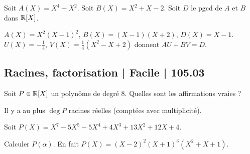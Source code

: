 \begin{question}

Soit $A(X) = X^4-X^2$. Soit $B(X) = X^2+X-2$.
Soit $D$ le pgcd de $A$ et $B$ dans $\mathbb{R}[X]$.
\begin{answers}



\end{answers}
\begin{explanations}
$A(X)=X^2(X-1)^2$, $B(X)=(X-1)(X+2)$, $D(X)=X-1$. $U(X)= -\frac14$, $V(X)=\frac14(X^2-X+2)$ donnent $AU+BV=D$.
\end{explanations}
\end{question}

\subsection{Racines, factorisation | Facile | 105.03}


\begin{question}

Soit $P \in \mathbb{R}[X]$ un polynôme de degré $8$.
Quelles sont les affirmations vraies ?
\begin{answers}



    
\end{answers}
\begin{explanations}
Il y a au plus $\deg P$ racines réelles (comptées avec multiplicité).
\end{explanations}
\end{question}


\begin{question}

Soit $P(X) = X^7 - 5 X^5 - 5 X^4 + 4 X^3 + 13 X^2 + 12 X + 4$.
\begin{answers}


    
    
\end{answers}
\begin{explanations}
Calculer $P(\alpha)$. En fait $P(X) = (X-2)^2(X+1)^3(X^2+X+1)$.
\end{explanations}
\end{question}



